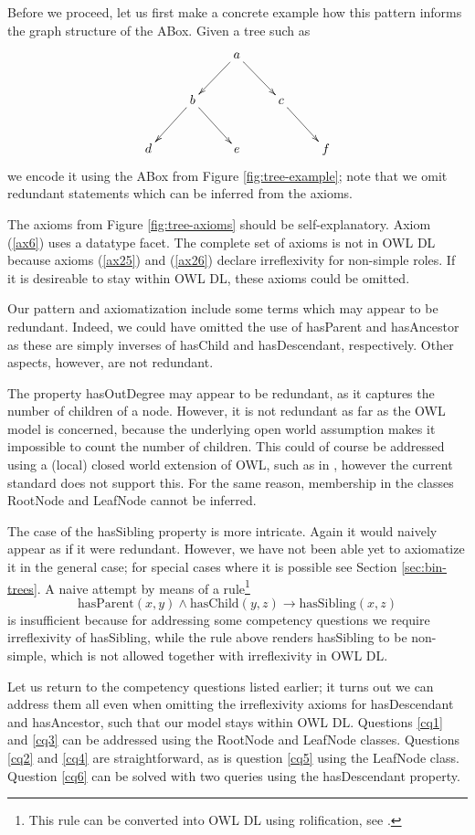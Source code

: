 Before we proceed, let us first make a concrete example how this pattern informs the graph structure of the ABox. Given a tree such as 
$$
\xymatrix{
& & a \ar[dl] \ar[dr] & &\\
& b \ar[dl] \ar[dr] & & c \ar[dr]&\\
d & & e & & f
}
$$
we encode it using the ABox from Figure \ref{fig:tree-example}; note that we omit redundant statements which can be inferred from the axioms. 

The axioms from Figure \ref{fig:tree-axioms} should be self-explanatory. Axiom (\ref{ax6}) uses a datatype facet. The complete set of axioms is not in OWL DL because axioms (\ref{ax25}) and (\ref{ax26}) declare irreflexivity for non-simple roles. If it is desireable to stay within OWL DL, these axioms could be omitted.

Our pattern and axiomatization include some terms which may appear to be redundant. Indeed, we could have omitted the use of hasParent and hasAncestor as these are simply inverses of hasChild and hasDescendant, respectively. Other aspects, however, are not redundant.

The property hasOutDegree may appear to be redundant, as it captures the number of children of a node. However, it is not redundant as far as the OWL model is concerned, because the underlying open world assumption makes it impossible to count the number of children. This could of course be addressed using a (local) closed world extension of OWL, such as in \cite{CarralJH12}, however the current standard does not support this. For the same reason, membership in the classes RootNode and LeafNode cannot be inferred.


\afterpage{\FloatBarrier}

The case of the hasSibling property is more intricate. Again it would naively appear as if it were redundant. However, we have not been able yet to axiomatize it in the general case; for special cases where it is possible see Section \ref{sec:bin-trees}. A naive attempt by means of a rule\footnote{This rule can be converted into OWL DL using rolification, see \cite{KrisnadhiMH11}.} 
$$\text{hasParent}(x,y) \wedge \text{hasChild}(y,z) \to \text{hasSibling}(x,z)$$ 
is insufficient because for addressing some competency questions we require irreflexivity of hasSibling, while the rule above renders hasSibling to be non-simple, which is not allowed together with irreflexivity in OWL DL.

Let us return to the competency questions listed earlier; it turns out we can address them all even when omitting the irreflexivity axioms for hasDescendant and hasAncestor, such that our model stays within OWL DL. Questions \ref{cq1} and \ref{cq3} can be addressed using the RootNode and LeafNode classes. Questions \ref{cq2} and \ref{cq4} are straightforward, as is question \ref{cq5} using the LeafNode class. Question \ref{cq6} can be solved with two queries using the hasDescendant property. 

